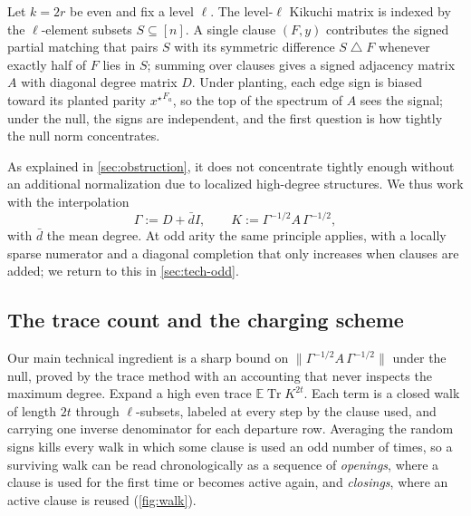 \documentclass[11pt]{article}
\theoremstyle{definition}
\theoremstyle{remark}
\newcommand{\E}{\mathbb E}
\newcommand{\1}{\mathbf 1}
\newcommand{\sd}{\mathbin{\triangle}}
\newcommand{\bd}{\bar d}
\newcommand{\xstar}{{x^\star}}
\DeclareMathOperator{\Tr}{Tr}
\numberwithin{equation}{section}
\begin{document}
Let $k=2r$ be even and fix a level $\ell$.  The level-$\ell$ Kikuchi
matrix is indexed by the $\ell$-element subsets $S\subseteq[n]$.  A
single clause $(F,y)$ contributes the signed partial matching that pairs
$S$ with its symmetric difference $S\sd F$ whenever exactly half of $F$
lies in $S$; summing over clauses gives a signed adjacency matrix $A$
with diagonal degree matrix $D$.  Under planting,
each edge sign is biased toward its planted parity $\xstar^{F_a}$, so
the top of the spectrum of $A$ sees the signal; under the null, the
signs are independent, and the first question is how tightly the
null norm concentrates.



As explained in
\cref{sec:obstruction}, it does not concentrate tightly enough without an additional normalization due to localized high-degree structures. 
We thus work with the
interpolation
\[
 \Gamma:=D+\bd I,
 \qquad
 K:=\Gamma^{-1/2}A\,\Gamma^{-1/2},
\]
with $\bd$ the mean degree. At odd arity the same
principle applies, with a locally sparse numerator and a diagonal
completion that only increases when clauses are added; we return to
this in \cref{sec:tech-odd}.

\subsection{The trace count and the charging scheme}\label{sec:tech-trace}

Our main technical ingredient is a sharp bound on
$\|\Gamma^{-1/2}A\,\Gamma^{-1/2}\|$ under the null, proved by the trace
method with an accounting that never inspects the maximum degree.
Expand a high even trace $\E\Tr K^{2t}$.  Each term is a closed walk of
length $2t$ through $\ell$-subsets, labeled at every step by the clause
used, and carrying one inverse denominator for each departure row.
Averaging the random signs kills every walk in which some clause is
used an odd number of times, so a surviving walk can be read
chronologically as a sequence of \emph{openings}, where a clause is used
for the first time or becomes active again, and \emph{closings}, where
an active clause is reused (\cref{fig:walk}).
\end{document}
